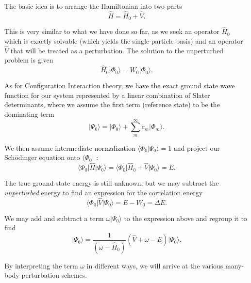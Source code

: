 The basic idea is to arrange the Hamiltonian into two parts
\begin{equation}
\hat{H} = \hat{H}_0 + \hat{V}.
\end{equation}

This is very similar to what we have done so far, as we seek an
operator $\hat{H}_0$ which is exactly solvable (which yields the
single-particle basis) and an operator $\hat{V}$ that will be treated as a
perturbation. The solution to the unperturbed problem is given
\begin{equation}
\hat{H}_0 \vert \Phi_0 \rangle = W_0 \vert \Phi_0 \rangle.
\end{equation}

As for Configuration Interaction theory, we have the exact ground state wave
function for our system represented by a linear combination of Slater
determinants, where we assume the first term (reference state) to be
the dominating term
\begin{equation}
\vert \Psi_0 \rangle = \vert \Phi_0 \rangle + \sum_m^\infty c_m \vert \Phi_m \rangle.
\end{equation}
 
We then assume intermediate normalization $\langle \Phi_0 \vert
\Psi_0 \rangle = 1$ and project our Schödinger equation onto $\langle
\Phi_0 \vert$ :
\begin{equation}
\langle \Phi_0 \vert \hat{H} \vert \Psi_0 \rangle = \langle \Phi_0 \vert \hat{H}_0 + \hat{V} \vert \Psi_0 \rangle = E.
\end{equation}

The true ground state energy is still unknown, but we
may subtract the \emph{unperturbed} energy to find an expression for
the correlation energy
\begin{equation}
\langle \Phi_0 \vert \hat{V} \vert \Psi_0 \rangle = E - W_0 = \Delta E.
\end{equation}

We may add and subtract a term $\omega \vert \Psi_0 \rangle$ to the expression above and regroup it to find
\begin{equation}
\vert \Psi_0  \rangle = \frac{1}{(\omega - \hat{H}_0)} (\hat{V} + \omega - E) \vert \Psi_0 \rangle .
\label{eqn:pt_1}
\end{equation}

By interpreting the term $\omega$ in different ways, we will arrive at the various many-body perturbation schemes.

